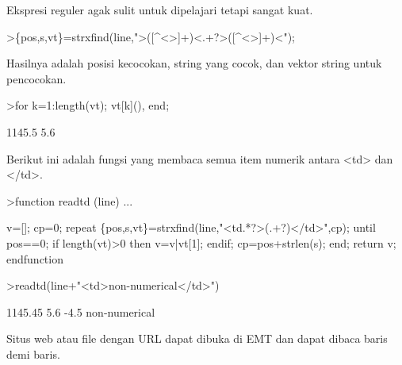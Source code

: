 \documentclass[a4paper,10pt]{article}
\begin{document}
\begin{eulernotebook}
\begin{eulercomment}
\begin{eulercomment}
\begin{eulercomment}
\begin{eulercomment}
\begin{eulercomment}
Ekspresi reguler agak sulit untuk dipelajari tetapi sangat kuat.
\end{eulercomment}
\begin{eulerprompt}
>\{pos,s,vt\}=strxfind(line,">([^<>]+)<.+?>([^<>]+)<");
\end{eulerprompt}
\begin{eulercomment}
Hasilnya adalah posisi kecocokan, string yang cocok, dan vektor string
untuk pencocokan.
\end{eulercomment}
\begin{eulerprompt}
>for k=1:length(vt); vt[k](), end;
\end{eulerprompt}
\begin{euleroutput}
  1145.5
  5.6
\end{euleroutput}
\begin{eulercomment}
Berikut ini adalah fungsi yang membaca semua item numerik antara \textless{}td\textgreater{}
dan \textless{}/td\textgreater{}.
\end{eulercomment}
\begin{eulerprompt}
>function readtd (line) ...
\end{eulerprompt}
\begin{eulerudf}
  v=[]; cp=0;
  repeat
     \{pos,s,vt\}=strxfind(line,"<td.*?>(.+?)</td>",cp);
     until pos==0;
     if length(vt)>0 then v=v|vt[1]; endif;
     cp=pos+strlen(s);
  end;
  return v;
  endfunction
\end{eulerudf}
\begin{eulerprompt}
>readtd(line+"<td>non-numerical</td>")
\end{eulerprompt}
\begin{euleroutput}
  1145.45
  5.6
  -4.5
  non-numerical
\end{euleroutput}
\begin{eulercomment}
Situs web atau file dengan URL dapat dibuka di EMT dan dapat dibaca
baris demi baris.


\end{eulercomment}
\end{eulercomment}
\end{eulercomment}
\end{eulercomment}
\end{eulercomment}
\end{eulernotebook}
\end{document}
